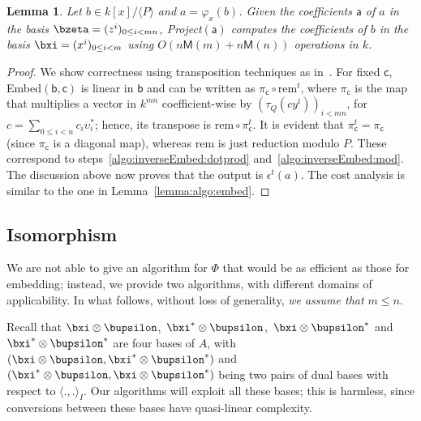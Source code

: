 \documentclass{sig-alternate}
\def\M {\ensuremath{\mathsf{M}}}
\def\va {\ensuremath{\mathsf{a}}}
\def\vb {\ensuremath{\mathsf{b}}}
\def\vc {\ensuremath{\mathsf{c}}}
\def\rem {\ensuremath{\mathrm{rem}}}
\newcounter{algo}
\newcommand{\ang}[1]{\langle#1\rangle}
\newtheorem{Lemma}{Lemma}
\begin{document}
\begin{Lemma}\label{lemma:project}
  Let $b \in k[x]/\ang{P}$ and $a=\varphi_x(b)$. Given the
  coefficients $\va$ of $a$ in the basis $\bzeta=(z^i)_{0 \le i
    < mn}$, {\sf Project}$(\va)$ computes the coefficients of $b$ in
  the basis $\bxi=(x^i)_{0 \le i < m}$ using $O(n\M(m) + n\M(n))$
  operations in $k$.
\end{Lemma}
\begin{proof}
  We show correctness using transposition techniques as
  in~\cite{bostan+lecerf+schost:tellegen}. For fixed $\vc$,
  {\sf Embed}$(\vb,\vc)$ is linear in $\vb$ and can be written as
  $\pi_\vc\circ\rem^t$, where $\pi_\vc$ is the map that multiplies a
  vector in $k^{mn}$ coefficient-wise by $(\tau_Q(c y^i))_{i<mn}$, for
  $c=\sum_{0 \le i < n} c_i \upsilon^\ast_i$; hence, its transpose is
  $\rem\circ\pi_\vc^t$. It is evident that $\pi_\vc^t=\pi_\vc$ (since
  $\pi_\vc$ is a diagonal map), whereas $\rem$ is just reduction
  modulo $P$. These correspond to
  steps~\ref{algo:inverseEmbed:dotprod}
  and~\ref{algo:inverseEmbed:mod}. The discussion above now proves
  that the output is $\epsilon^t(a)$. The cost analysis is similar to
  the one in Lemma~\ref{lemma:algo:embed}.
\end{proof}


\subsection{Isomorphism} 

We are not able to give an algorithm for $\Phi$ that would be as
efficient as those for embedding; instead, we provide two algorithms,
with different domains of applicability. In what follows, without
loss of generality, {\em we assume that $m\le n$}.

Recall that $\bxi \otimes \bupsilon$,\ $\bxi^\ast \otimes
\bupsilon$,\ $\bxi \otimes \bupsilon^\ast$ and $\bxi^\ast \otimes
\bupsilon^\ast$ are four bases of $A$, with $(\bxi \otimes \bupsilon,
\bxi^\ast \otimes \bupsilon^\ast)$ and $(\bxi^\ast \otimes \bupsilon,
\bxi \otimes \bupsilon^\ast)$ being two pairs of dual bases with
respect to $\ang{.,.}_I$. Our algorithms will exploit all these bases;
this is harmless, since conversions between these bases have
quasi-linear complexity.
\end{document}
